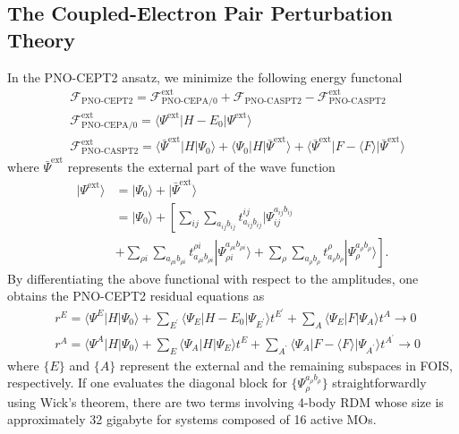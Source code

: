 \documentclass[aip,jcp,amsmath,twocolumn,floatfix,reprint,fleqn]{revtex4-1}
\begin{document}
\subsection{The Coupled-Electron Pair Perturbation Theory}\label{Subsec:cept2}
%
In the PNO-CEPT2 ansatz, we minimize the following energy functonal
%
\begin{align}
  &\mathscr{F}_\text{PNO-CEPT2} = \mathscr{F}_\text{PNO-CEPA/0}^\text{ext}+\mathscr{F}_\text{PNO-CASPT2}-\mathscr{F}_\text{PNO-CASPT2}^\text{ext} \label{eq:F-CEPT2} \\
  &\mathscr{F}_\text{PNO-CEPA/0}^\text{ext} = \langle\Psi^\text{ext}|H-E_0|\Psi^\text{ext}\rangle \label{eq:F-CEPA/0} \\
  &\mathscr{F}_\text{PNO-CASPT2}^\text{ext} = \langle\bar{\Psi}^\text{ext}|H|\Psi_0\rangle + \langle\Psi_0|H|\bar{\Psi}^\text{ext}\rangle+\langle\bar{\Psi}^\text{ext}|F-\langle F\rangle|\bar{\Psi}^\text{ext}\rangle \label{eq:F-CASPT2}
\end{align}
%
where $\bar{\Psi}^\text{ext}$ represents the external part of the wave function
%
\begin{align}
  |\Psi^\text{ext}\rangle&=|\Psi_0\rangle+|\bar{\Psi}^\text{ext}\rangle \nonumber \\
  &=|\Psi_0\rangle+\left[\sum_{ij}\sum_{a_{ij}b_{ij}} t_{a_{ij}b_{ij}}^{ij}|\Psi^{a_{ij}b_{ij}}_{ij} \right. \nonumber \\
    &+ \left.\sum_{\rho i}\sum_{a_{\rho i}b_{\rho i}} t_{a_{\rho i}b_{\rho i}}^{\rho i}|\Psi^{a_{\rho i}b_{\rho i}}_{\rho i}\rangle + \sum_{\rho}\sum_{a_{\rho}b_{\rho}} t_{a_{\rho}b_{\rho}}^{\rho}|\Psi^{a_{\rho}b_{\rho}}_{\rho}\rangle\right].
\end{align}
%
By differentiating the above functional with respect to the amplitudes, one obtains the PNO-CEPT2 residual equations as
%
\begin{align}
  &r^{E}=\langle\Psi^{E}|H|\Psi_0\rangle+\sum_{E^{'}}\langle\Psi_E|H-E_0|\Psi_{E^{'}}\rangle t^{E^{'}}+\sum_{A}\langle\Psi_E|F|\Psi_A\rangle t^A \rightarrow 0 \label{eq:CEPT-E} \\
  &r^{A}=\langle\Psi^{A}|H|\Psi_0\rangle+\sum_{E}\langle\Psi_A|H|\Psi_E\rangle t^E+\sum_{A^{'}}\langle\Psi_A|F-\langle F\rangle|\Psi_{A^{'}}\rangle t^{A^{'}} \rightarrow 0 \label{eq:CEPT-A}
\end{align}
%
where $\{E\}$ and $\{A\}$ represent the external and the remaining subspaces in FOIS, respectively.
%
If one evaluates the diagonal block for $\{\Psi_{\rho}^{a_{\rho}b_{\rho}}\}$ straightforwardly using Wick's theorem, there are two terms involving 4-body RDM whose size is approximately 32 gigabyte for systems composed of 16 active MOs.
\end{document}
